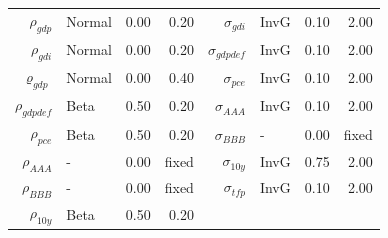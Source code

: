 \documentclass[12pt]{article}
\begin{document}
{\begin{longtable}{rlrr@{\hspace{1in}}rlrr}
$\rho_{gdp}$ & Normal & 0.00 & 0.20 & $\sigma_{gdi}$ & InvG & 0.10 & 2.00 \\
$\rho_{gdi}$ & Normal & 0.00 & 0.20 & $\sigma_{gdpdef}$ & InvG & 0.10 & 2.00 \\
$\varrho_{gdp}$ & Normal & 0.00 & 0.40 & $\sigma_{pce}$ & InvG & 0.10 & 2.00 \\
$\rho_{gdpdef}$ & Beta & 0.50 & 0.20 & $\sigma_{AAA}$ & InvG & 0.10 & 2.00 \\
$\rho_{pce}$ & Beta & 0.50 & 0.20 & $\sigma_{BBB}$ & - & 0.00 & \scriptsize{fixed} \\
$\rho_{AAA}$ & - & 0.00 & \scriptsize{fixed} & $\sigma_{10y}$ & InvG & 0.75 & 2.00 \\
$\rho_{BBB}$ & - & 0.00 & \scriptsize{fixed} & $\sigma_{tfp}$ & InvG & 0.10 & 2.00 \\
$\rho_{10y}$ & Beta & 0.50 & 0.20 && & & \\[3pt]
\end{longtable}}
\end{document}
